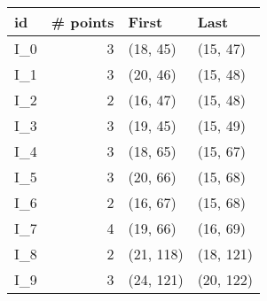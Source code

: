 \begin{tabular}{lrll}
\toprule
   id &  \# points &      First &       Last \\
\midrule
 I\_0 &          3 &   (18, 45) &   (15, 47) \\
 I\_1 &          3 &   (20, 46) &   (15, 48) \\
 I\_2 &          2 &   (16, 47) &   (15, 48) \\
 I\_3 &          3 &   (19, 45) &   (15, 49) \\
 I\_4 &          3 &   (18, 65) &   (15, 67) \\
 I\_5 &          3 &   (20, 66) &   (15, 68) \\
 I\_6 &          2 &   (16, 67) &   (15, 68) \\
 I\_7 &          4 &   (19, 66) &   (16, 69) \\
 I\_8 &          2 &  (21, 118) &  (18, 121) \\
 I\_9 &          3 &  (24, 121) &  (20, 122) \\
\bottomrule
\end{tabular}
